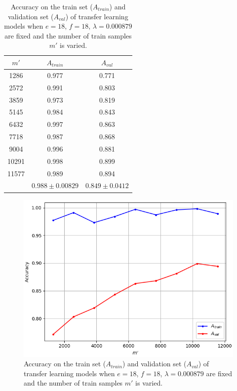 \begin{table}[ht]
\centering
\begin{tabular}{ |c|c|c| }
\hline
$m'$ & $A_{train}$ & $A_{val}$ \\
\hline
1286 & 0.977 & 0.771  \\
2572 & 0.991 & 0.803  \\
3859 & 0.973 & 0.819  \\
5145 & 0.984 & 0.843  \\
6432 & 0.997 & 0.863  \\
7718 & 0.987 & 0.868  \\
9004 & 0.996 & 0.881  \\
10291 & 0.998 & 0.899 \\
11577 & 0.989 & 0.894 \\
\hline
 & $0.988\pm0.00829$ & $0.849\pm0.0412$ \\
\hline
\end{tabular}
\caption{Accuracy on the train set ($A_{train}$) and validation set ($A_{val}$) of transfer learning models when $e = 18$, $f = 18$, $\lambda = 0.000879$ are fixed and the number of train samples $m'$ is varied.}
\label{table:vgg16_total_debug}
\end{table}

\begin{figure}[ht]
    \centering
    \includegraphics[width=1.0\textwidth]{figs/vgg16_total_debug.png}
    \caption{Accuracy on the train set ($A_{train}$) and validation set ($A_{val}$) of transfer learning models when $e = 18$, $f = 18$, $\lambda = 0.000879$ are fixed and the number of train samples $m'$ is varied.}
    \label{fig:vgg16_total_debug}
\end{figure}

